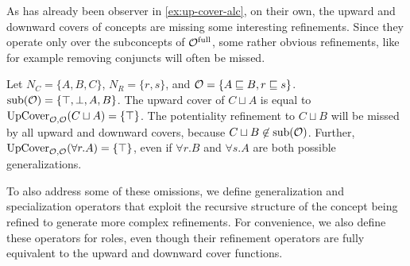 As has already been observer in \cref{ex:up-cover-alc}, on their own, the upward and downward covers of concepts are missing some interesting refinements. Since they operate only over the subconcepts of ${\mathcal{O}^\textnormal{full}}$, some rather obvious refinements, like for example removing conjuncts will often be missed.
\begin{example} \label{exa:up-cover}
  Let $N_C = \{A, B, C\}$, $N_R = \{ r, s \}$, and $\mathcal{O} = \{A \sqsubseteq B, r \sqsubseteq s\}$. ${\operatorname{sub}}(\mathcal{O}) = \{\top, \bot, A, B\}$. The upward cover of $C \sqcup A$ is equal to ${\operatorname{UpCover}}_{\mathcal{O},\mathcal{O}}(C \sqcup A) = \{ \top \}$. The potentiality refinement to $C \sqcup B$ will be missed by all upward and downward covers, because $C \sqcup B \not\in {\ensuremath{\operatorname{sub}}}(\mathcal{O})$. Further, ${\operatorname{UpCover}}_{\mathcal{O},\mathcal{O}}(\forall r.A) = \{ \top \}$, even if $\forall r.B$ and $\forall s.A$ are both possible generalizations.
\end{example}

To also address some of these omissions, we define generalization and specialization operators that exploit the recursive structure of the concept being refined to generate more complex refinements. For convenience, we also define these operators for roles, even though their refinement operators are fully equivalent to the upward and downward cover functions.

